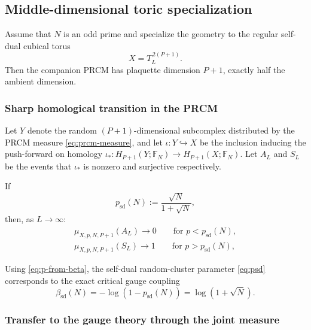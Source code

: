 \subsection{Middle-dimensional toric specialization}
\label{sec:specializations-middle-torus}

Assume that \(N\) is an odd prime and specialize the geometry to the regular
self-dual cubical torus
\begin{equation}
	X=T_L^{\,2(P+1)}.
	\label{eq:middle-torus-geometry}
\end{equation}
Then the companion PRCM has plaquette dimension
\(P+1\), exactly half the ambient dimension.

\subsubsection{Sharp homological transition in the PRCM}

Let \(Y\) denote the random \((P+1)\)-dimensional subcomplex distributed by
the PRCM measure \eqref{eq:prcm-measure}, and let \(\iota:Y\hookrightarrow X\)
be the inclusion inducing the push-forward on homology $\iota_*:H_{P+1}(Y;\mathbb F_N)\to H_{P+1}(X;\mathbb F_N)$. Let $A_L$ and $S_L$ be the events that $\iota_*$ is nonzero and surjective respectively.

\begin{theorem}
	\label{thm:DS-middle-torus}
	If
	\begin{equation}
		p_{\mathrm{sd}}(N):=\frac{\sqrt N}{1+\sqrt N},
		\label{eq:psd}
	\end{equation}
	then, as $L \to \infty$:
	\begin{gather}
		\mu_{X,p,N,P+1}(A_L)\to 0
		\qquad
		\text{for }p<p_{\mathrm{sd}}(N),
		\label{eq:middle-below}
		\\
		\mu_{X,p,N,P+1}(S_L)\to 1
		\qquad
		\text{for }p>p_{\mathrm{sd}}(N),
		\label{eq:middle-above}
	\end{gather}
\end{theorem}

Using \eqref{eq:p-from-beta}, the self-dual random-cluster parameter
\eqref{eq:psd} corresponds to the exact critical gauge coupling
\begin{equation}
	\beta_{\mathrm{sd}}(N)
	=
	-\log\left(1-p_{\mathrm{sd}}(N)\right)
	=
	\log(1+\sqrt N).
	\label{eq:betasd}
\end{equation}

\subsubsection{Transfer to the gauge theory through the joint measure}

